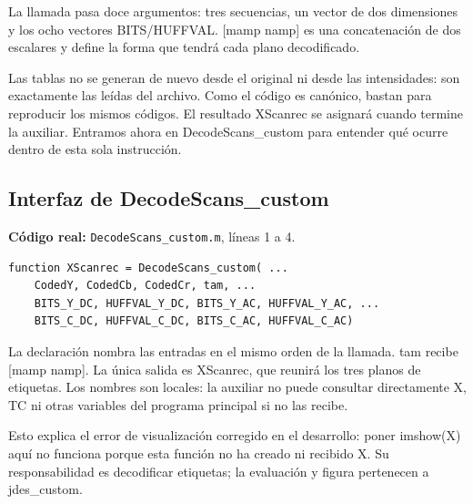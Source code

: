 \documentclass[11pt,a4paper,oneside]{report}
\begin{document}
La llamada pasa doce argumentos: tres secuencias, un vector de dos dimensiones
y los ocho vectores BITS/HUFFVAL. [mamp namp] es una concatenación de dos
escalares y define la forma que tendrá cada plano decodificado.

Las tablas no se generan de nuevo desde el original ni desde las intensidades:
son exactamente las leídas del archivo. Como el código es canónico, bastan
para reproducir los mismos códigos. El resultado XScanrec se asignará cuando
termine la auxiliar. Entramos ahora en DecodeScans\_custom para entender
qué ocurre dentro de esta sola instrucción.


\par\medskip\noindent\begin{minipage}{\linewidth}

\subsection{Interfaz de DecodeScans\_custom}

\textbf{Código real:} \texttt{DecodeScans\_custom.m}, líneas 1 a 4.

\begin{lstlisting}[firstnumber=1]
function XScanrec = DecodeScans_custom( ...
    CodedY, CodedCb, CodedCr, tam, ...
    BITS_Y_DC, HUFFVAL_Y_DC, BITS_Y_AC, HUFFVAL_Y_AC, ...
    BITS_C_DC, HUFFVAL_C_DC, BITS_C_AC, HUFFVAL_C_AC)
\end{lstlisting}

\end{minipage}\par


La declaración nombra las entradas en el mismo orden de la llamada.
tam recibe [mamp namp]. La única salida es XScanrec, que reunirá los tres
planos de etiquetas. Los nombres son locales: la auxiliar no puede consultar
directamente X, TC ni otras variables del programa principal si no las recibe.

Esto explica el error de visualización corregido en el desarrollo: poner
imshow(X) aquí no funciona porque esta función no ha creado ni recibido X.
Su responsabilidad es decodificar etiquetas; la evaluación y figura pertenecen
a jdes\_custom.
\end{document}
